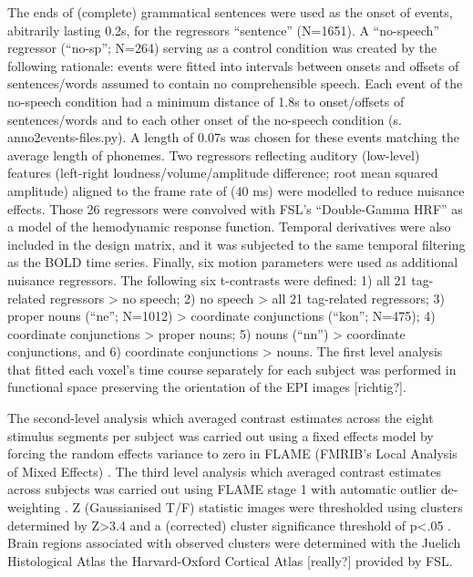 \documentclass[10pt,a4paper,twocolumn]{article}
\begin{document}
The ends of (complete) grammatical sentences were used as the onset of events, abitrarily lasting 0.2s, for the regressors “sentence” (N=1651).
A “no-speech” regressor (“no-sp”; N=264) serving as a control condition was created by the following rationale: events were fitted into intervals between onsets and offsets of sentences/words assumed to contain no comprehensible speech. Each event of the no-speech condition had a minimum distance of 1.8s to onset/offsets of sentences/words and to each other onset of the no-speech condition (s. anno2events-files.py). A length of 0.07s was chosen for these events matching the average length of phonemes.
Two regressors reflecting auditory (low-level) features (left-right loudness/volume/amplitude difference; root mean squared amplitude) aligned to the frame rate of (40 ms) were modelled to reduce nuisance effects.
Those 26 regressors were convolved with FSL's “Double-Gamma HRF” as a model of the hemodynamic response function. Temporal derivatives were also included in the design matrix, and it was subjected to the same temporal filtering as the BOLD time series. Finally, six motion parameters were used as additional nuisance regressors.
The following six t-contrasts were defined: 1) all 21 tag-related regressors > no speech; 2) no speech > all 21 tag-related regressors; 3) proper nouns (“ne”; N=1012) > coordinate conjunctions (“kon”; N=475); 4) coordinate conjunctions > proper nouns; 5) nouns (“nn”) > coordinate conjunctions, and 6) coordinate conjunctions > nouns. The first level analysis that fitted each voxel’s time course separately for each subject was performed in functional space preserving the orientation of the EPI images [richtig?].

The second-level analysis which averaged contrast estimates across the eight stimulus segments per subject was carried out using a fixed effects model by forcing the random effects variance to zero in FLAME (FMRIB’s Local Analysis of Mixed Effects) \citep{beckmann2003general, woolrich2004multilevel}. The third level analysis which averaged contrast estimates across subjects was carried out using FLAME stage 1 with automatic outlier de-weighting \citep{beckmann2003general, woolrich2004multilevel, woolrich2008robust}.
Z (Gaussianised T/F) statistic images were thresholded using clusters determined by Z>3.4 and a (corrected) cluster significance threshold of p<.05 \citep{woolrich2008robust}. Brain regions associated with observed clusters were determined with the Juelich Histological Atlas \citep{eickhoff2005toolbox,eickhoff2007assignment} the Harvard-Oxford Cortical Atlas \citep{desikan2006automated}[really?] provided by FSL.
\end{document}
